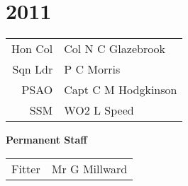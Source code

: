 \chapter*{2011}

\vspace*{20mm}

\begin{center}
  \begin{tabular}{rl}
    Hon Col & Col N C Glazebrook \\
    Sqn Ldr & P C Morris \\
    PSAO & Capt C M Hodgkinson \\
    SSM & WO2 L Speed \\
  \end{tabular}
\end{center}

\begin{center}
  \Large
  \textbf{Permanent Staff}
\end{center}

\begin{center}
  \begin{tabular}{rl}
    Fitter & Mr G Millward \\
  \end{tabular}
\end{center}
